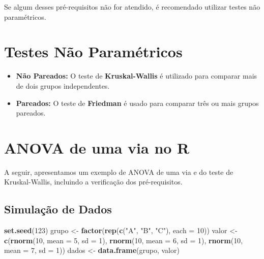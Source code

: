 \documentclass[
]{book}
\newenvironment{Shaded}{\begin{snugshade}}{\end{snugshade}}
\newcommand{\AttributeTok}[1]{\textcolor[rgb]{0.13,0.29,0.53}{#1}}
\newcommand{\DecValTok}[1]{\textcolor[rgb]{0.00,0.00,0.81}{#1}}
\newcommand{\FunctionTok}[1]{\textcolor[rgb]{0.13,0.29,0.53}{\textbf{#1}}}
\newcommand{\NormalTok}[1]{#1}
\newcommand{\OtherTok}[1]{\textcolor[rgb]{0.56,0.35,0.01}{#1}}
\newcommand{\StringTok}[1]{\textcolor[rgb]{0.31,0.60,0.02}{#1}}
\providecommand{\tightlist}{%
  \setlength{\itemsep}{0pt}\setlength{\parskip}{0pt}}
\begin{document}
Se algum desses pré-requisitos não for atendido, é recomendado utilizar testes não paramétricos.

\section{Testes Não Paramétricos}\label{testes-nuxe3o-paramuxe9tricos}

\begin{itemize}
\tightlist
\item
  \textbf{Não Pareados:} O teste de \textbf{Kruskal-Wallis} é utilizado para comparar mais de dois grupos independentes.
\item
  \textbf{Pareados:} O teste de \textbf{Friedman} é usado para comparar três ou mais grupos pareados.
\end{itemize}

\section{ANOVA de uma via no R}\label{anova-de-uma-via-no-r}

A seguir, apresentamos um exemplo de ANOVA de uma via e do teste de Kruskal-Wallis, incluindo a verificação dos pré-requisitos.

\subsection{Simulação de Dados}\label{simulauxe7uxe3o-de-dados}

\begin{Shaded}
\begin{Highlighting}[]
\FunctionTok{set.seed}\NormalTok{(}\DecValTok{123}\NormalTok{)}
\NormalTok{grupo }\OtherTok{\textless{}{-}} \FunctionTok{factor}\NormalTok{(}\FunctionTok{rep}\NormalTok{(}\FunctionTok{c}\NormalTok{(}\StringTok{"A"}\NormalTok{, }\StringTok{"B"}\NormalTok{, }\StringTok{"C"}\NormalTok{), }\AttributeTok{each =} \DecValTok{10}\NormalTok{))}
\NormalTok{valor }\OtherTok{\textless{}{-}} \FunctionTok{c}\NormalTok{(}\FunctionTok{rnorm}\NormalTok{(}\DecValTok{10}\NormalTok{, }\AttributeTok{mean =} \DecValTok{5}\NormalTok{, }\AttributeTok{sd =} \DecValTok{1}\NormalTok{),}
           \FunctionTok{rnorm}\NormalTok{(}\DecValTok{10}\NormalTok{, }\AttributeTok{mean =} \DecValTok{6}\NormalTok{, }\AttributeTok{sd =} \DecValTok{1}\NormalTok{),}
           \FunctionTok{rnorm}\NormalTok{(}\DecValTok{10}\NormalTok{, }\AttributeTok{mean =} \DecValTok{7}\NormalTok{, }\AttributeTok{sd =} \DecValTok{1}\NormalTok{))}
\NormalTok{dados }\OtherTok{\textless{}{-}} \FunctionTok{data.frame}\NormalTok{(grupo, valor)}
\end{Highlighting}
\end{Shaded}
\end{document}
